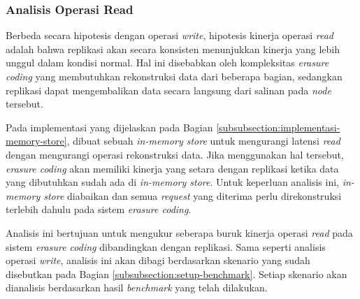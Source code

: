 
\subsubsection{Analisis Operasi Read}
\label{subsubsection:analisis-operasi-read}

Berbeda secara hipotesis dengan operasi \textit{write}, hipotesis kinerja operasi \textit{read} adalah bahwa replikasi akan secara konsisten menunjukkan kinerja yang lebih unggul dalam kondisi normal. Hal ini disebabkan oleh kompleksitas \textit{erasure coding} yang membutuhkan rekonstruksi data dari beberapa bagian, sedangkan replikasi dapat mengembalikan data secara langsung dari salinan pada \textit{node} tersebut.

Pada implementasi yang dijelaskan pada Bagian \ref{subsubsection:implementasi-memory-store}, dibuat sebuah \textit{in-memory store} untuk mengurangi latensi \textit{read} dengan mengurangi operasi rekonstruksi data. Jika menggunakan hal tersebut, \textit{erasure coding} akan memiliki kinerja yang setara dengan replikasi ketika data yang dibutuhkan sudah ada di \textit{in-memory store}. Untuk keperluan analisis ini, \textit{in-memory store} diabaikan dan semua \textit{request} yang diterima perlu direkonstruksi terlebih dahulu pada sistem \textit{erasure coding}.

Analisis ini bertujuan untuk mengukur seberapa buruk kinerja operasi \textit{read} pada sistem \textit{erasure coding} dibandingkan dengan replikasi. Sama seperti analisis operasi \textit{write}, analisis ini akan dibagi berdasarkan skenario yang sudah disebutkan pada Bagian \ref{subsubsection:setup-benchmark}. Setiap skenario akan dianalisis berdasarkan hasil \textit{benchmark} yang telah dilakukan.

